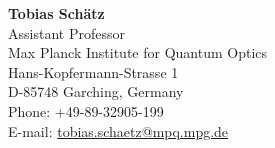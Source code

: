 \documentclass[letter]{article}
\begin{document}
{\bf Tobias Sch\"atz}\\
Assistant Professor\\
Max Planck Institute for Quantum Optics\\
Hans-Kopfermann-Strasse 1\\
D-85748 Garching, Germany\\
Phone: +49-89-32905-199\\
E-mail: \url{tobias.schaetz@mpq.mpg.de}\\





\end{document}
